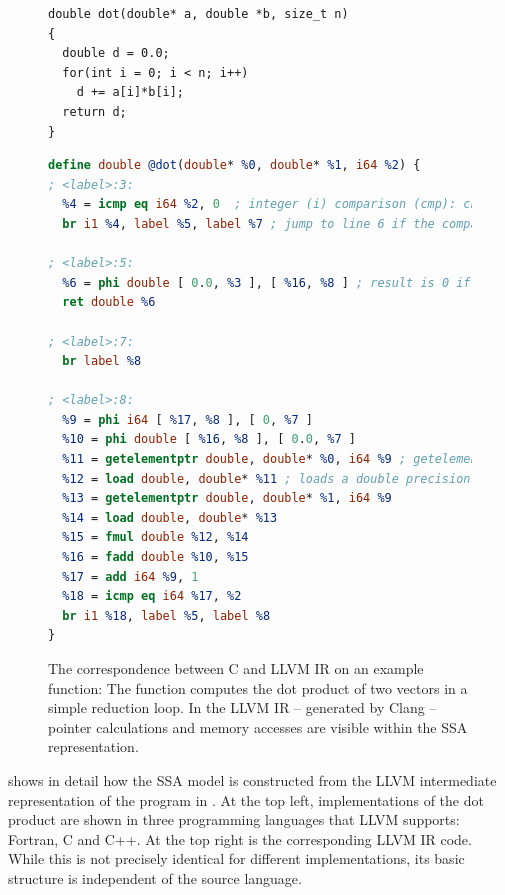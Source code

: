 \begin{figure}[p]
\vspace{-0.09cm}
\begin{lstlisting}[language=MyCpp,captionpos=t,title=
   {{\bf(a)} {} C source code of a dot product function implementation:
    \leftskip=0pt}]
double dot(double* a, double *b, size_t n)
{
  double d = 0.0;
  for(int i = 0; i < n; i++)
    d += a[i]*b[i];
  return d;
}
\end{lstlisting}
\vspace{-0.09cm}
\begin{lstlisting}[language=LLVM,breaklines=true,captionpos=t,title=
   {{\bf(b)} {} LLVM IR of the same dot product function:
    \leftskip=0pt}]
define double @dot(double* %0, double* %1, i64 %2) {
; <label>:3:
  %4 = icmp eq i64 %2, 0  ; integer (i) comparison (cmp): check if register %2 is equal (eq) to constant zero
  br i1 %4, label %5, label %7 ; jump to line 6 if the comparison held, otherwise jump to line 10 instead

; <label>:5:
  %6 = phi double [ 0.0, %3 ], [ %16, %8 ] ; result is 0 if the phi node was reached from line 4, otherwise it was reached from line 24 and the result is taken from %16
  ret double %6

; <label>:7:
  br label %8

; <label>:8:
  %9 = phi i64 [ %17, %8 ], [ 0, %7 ]
  %10 = phi double [ %16, %8 ], [ 0.0, %7 ]
  %11 = getelementptr double, double* %0, i64 %9 ; getelementptr calculates memory addresses: here it computes the address of the %9-th value in the array %0
  %12 = load double, double* %11 ; loads a double precision floating point value from the calculated address
  %13 = getelementptr double, double* %1, i64 %9
  %14 = load double, double* %13
  %15 = fmul double %12, %14
  %16 = fadd double %10, %15
  %17 = add i64 %9, 1
  %18 = icmp eq i64 %17, %2
  br i1 %18, label %5, label %8
}
\end{lstlisting}
\caption{The correspondence between C and LLVM IR on an example function:
         The function computes the dot product of two vectors in a simple
         reduction loop.
         In the LLVM IR -- generated by Clang -- pointer calculations and memory
         accesses are visible within the SSA representation.}
\label{llvmirexample}
\end{figure}

     shows in detail how the SSA model is constructed from
    the LLVM intermediate representation of the program in .
    At the top left, implementations of the dot product are shown
    in three programming languages that LLVM supports: Fortran, C and C++.
    At the top right is the corresponding LLVM IR code.
    While this is not precisely identical for different implementations,
    its basic structure is independent of the source language.

